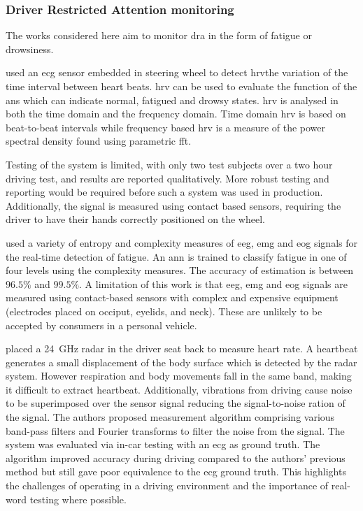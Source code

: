 \documentclass[11pt, parskip=half*,twoside=false]{scrbook}
\begin{document}
\subsubsection{Driver Restricted Attention monitoring}
The works considered here aim to monitor \gls{dra} in the form of fatigue or drowsiness.
 
\citet{jungDriverFatigueDrowsiness2014} used an \gls{ecg} sensor embedded in steering wheel to detect \gls{hrv}\textemdash the variation of the time interval between heart beats. \gls{hrv} can be used to evaluate the function of the \gls{ans} which can indicate normal, fatigued and drowsy states. \gls{hrv} is analysed in both the time domain and the frequency domain. Time domain \gls{hrv} is based on beat-to-beat intervals while frequency based \gls{hrv} is a measure of the power spectral density found using parametric \gls{fft}.

Testing of the system is limited, with only two test subjects over a two hour driving test, and results are reported qualitatively. More robust testing and reporting would be required before such a system was used in production. Additionally, the signal is measured using contact based sensors, requiring the driver to have their hands correctly positioned on the wheel. 
 
\citet{zhangAutomatedDetectionDriver2014} used a variety of entropy and complexity measures of \gls{eeg}, \gls{emg} and \gls{eog} signals for the real-time detection of fatigue. An \gls{ann} is trained to classify fatigue in one of four levels using the complexity measures. The accuracy of estimation is between $96.5\%$ and $99.5\%$. A limitation of this work is that \gls{eeg}, \gls{emg} and \gls{eog} signals are measured using contact-based sensors with complex and expensive equipment (electrodes placed on occiput, eyelids, and neck). These are unlikely to be accepted by consumers in a personal vehicle.

\citet{tsuchiyaHeartbeatDetectionTechnology2020} placed a 24~GHz radar in the driver seat back to measure heart rate. A heartbeat generates a small displacement of the body surface which is detected by the radar system. However  respiration and body movements fall in the same band, making it difficult to extract heartbeat. Additionally, vibrations from driving cause noise to be superimposed over the sensor signal reducing the signal-to-noise ration of the signal. The authors proposed measurement algorithm comprising various band-pass filters and Fourier transforms to filter the noise from the signal. The system was evaluated via in-car testing with an \gls{ecg} as ground truth. The algorithm improved accuracy during driving compared to the authors' previous method but still gave poor equivalence to the \gls{ecg} ground truth. This highlights the challenges of operating in a driving environment and the importance of real-word testing where possible. 
\end{document}
